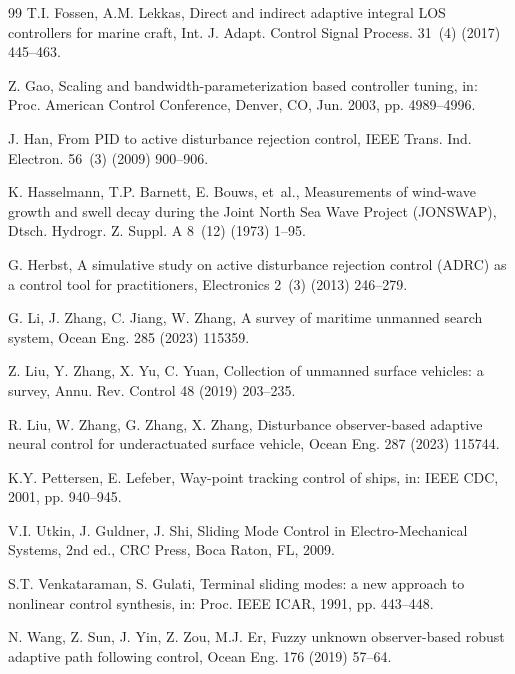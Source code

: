 \documentclass[review]{cas-dc}
\begin{document}
\begin{thebibliography}{99}
T.I. Fossen, A.M. Lekkas, Direct and indirect adaptive integral LOS controllers for marine craft, Int. J. Adapt. Control Signal Process. 31~(4) (2017) 445--463.

Z. Gao, Scaling and bandwidth-parameterization based controller tuning, in: Proc. American Control Conference, Denver, CO, Jun. 2003, pp. 4989--4996.

J. Han, From PID to active disturbance rejection control, IEEE Trans. Ind. Electron. 56~(3) (2009) 900--906.

K. Hasselmann, T.P. Barnett, E. Bouws, et~al., Measurements of wind-wave growth and swell decay during the Joint North Sea Wave Project (JONSWAP), Dtsch. Hydrogr. Z. Suppl. A 8~(12) (1973) 1--95.

G. Herbst, A simulative study on active disturbance rejection control (ADRC) as a control tool for practitioners, Electronics 2~(3) (2013) 246--279.

G. Li, J. Zhang, C. Jiang, W. Zhang, A survey of maritime unmanned search system, Ocean Eng. 285 (2023) 115359.

Z. Liu, Y. Zhang, X. Yu, C. Yuan, Collection of unmanned surface vehicles: a survey, Annu. Rev. Control 48 (2019) 203--235.

R. Liu, W. Zhang, G. Zhang, X. Zhang, Disturbance observer-based adaptive neural control for underactuated surface vehicle, Ocean Eng. 287 (2023) 115744.

K.Y. Pettersen, E. Lefeber, Way-point tracking control of ships, in: IEEE CDC, 2001, pp. 940--945.

V.I. Utkin, J. Guldner, J. Shi, Sliding Mode Control in Electro-Mechanical Systems, 2nd ed., CRC Press, Boca Raton, FL, 2009.

S.T. Venkataraman, S. Gulati, Terminal sliding modes: a new approach to nonlinear control synthesis, in: Proc. IEEE ICAR, 1991, pp. 443--448.

N. Wang, Z. Sun, J. Yin, Z. Zou, M.J. Er, Fuzzy unknown observer-based robust adaptive path following control, Ocean Eng. 176 (2019) 57--64.


\end{thebibliography}
\end{document}
